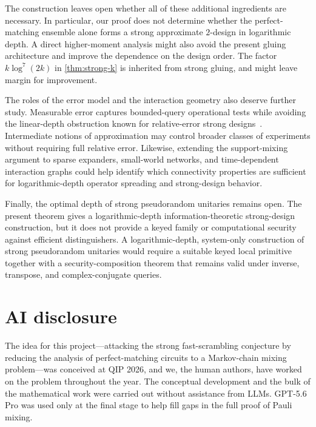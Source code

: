 \documentclass[
    aps,
    superscriptaddress,
    onecolumn,
    10pt,
    prx,
    nofootinbib
]{revtex4-2}
\theoremstyle{namedstatement}
\theoremstyle{plain}
\begin{document}
The construction leaves open whether all of these additional ingredients are necessary. In particular, our proof does not determine whether the perfect-matching ensemble alone forms a strong approximate $2$-design in logarithmic depth. A direct higher-moment analysis might also avoid the present gluing architecture and improve the dependence on the design order. The factor $k\log^7(2k)$ in \cref{thm:strong-k} is inherited from strong gluing, and might leave margin for improvement.

The roles of the error model and the interaction geometry also deserve further study. Measurable error captures bounded-query operational tests while avoiding the linear-depth obstruction known for relative-error strong designs~\cite{SchusterEtAlStrong2025}. Intermediate notions of approximation may control broader classes of experiments without requiring full relative error. Likewise, extending the support-mixing argument to sparse expanders, small-world networks, and time-dependent interaction graphs could help identify which connectivity properties are sufficient for logarithmic-depth operator spreading and strong-design behavior.

Finally, the optimal depth of strong pseudorandom unitaries remains open.
The present theorem gives a logarithmic-depth information-theoretic strong-design construction, but it does not provide a keyed family or computational security against efficient distinguishers. A logarithmic-depth, system-only construction of strong pseudorandom unitaries would require a suitable keyed local primitive together with a security-composition theorem that remains valid under inverse, transpose, and complex-conjugate queries.

\section{AI disclosure}
The idea for this project—attacking the strong fast-scrambling conjecture by reducing the analysis of perfect-matching circuits to a Markov-chain mixing problem—was conceived at QIP 2026, and we, the human authors, have worked on the problem throughout the year. The conceptual development and the bulk of the mathematical work were carried out without assistance from LLMs. GPT-5.6 Pro was used only at the final stage to help fill gaps in the full proof of Pauli mixing. 
\end{document}
